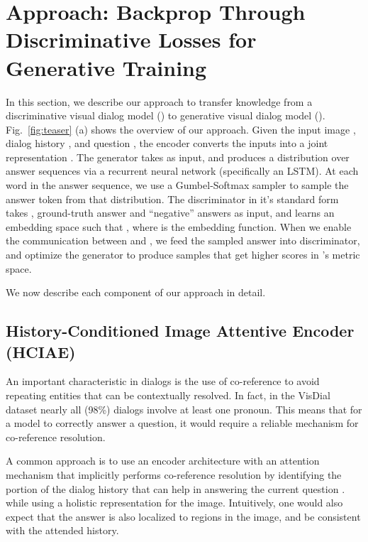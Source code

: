\documentclass{article}
\newcommand{\vd}{VisDial\xspace}
\newcommand{\ourenc}{HCIAE\xspace}
\begin{document}
\section{Approach: Backprop Through Discriminative Losses for Generative Training}
\vspace{-1mm}
In this section, we describe our approach to transfer knowledge from a discriminative visual dialog model () 
to generative visual dialog model ().  
Fig.~\ref{fig:teaser} (a) shows the overview of our approach.  
Given the input image , dialog history , and question , the encoder converts the inputs into a joint representation 
. 
The generator  takes  as input, and produces a distribution over answer sequences via a recurrent 
neural network (specifically an LSTM).  
At each word in the answer sequence, we use a Gumbel-Softmax sampler  to sample the answer token from that distribution. 
The discriminator  in it's standard form takes , ground-truth answer  and  ``negative'' answers 
 as input, and learns an embedding space such that 
, 
where  is the embedding function. 
When we enable the communication between  and , 
we feed the sampled answer  into discriminator, 
and optimize the generator  to produce samples that get higher scores in 's metric space. 

We now describe each component of our approach in detail. 

\subsection{History-Conditioned Image Attentive Encoder (\ourenc)}
\label{sec:encoder}

An important characteristic in dialogs is the use of co-reference to avoid repeating entities that can be contextually resolved. In fact, in the 
\vd dataset \cite{visdial} nearly all (98\%) dialogs involve at least one pronoun. 
This means that for a model to correctly answer a question, it would require a reliable mechanism for co-reference resolution. 

A common approach is to use an encoder architecture with an attention mechanism that implicitly performs co-reference resolution 
by identifying the portion of the dialog history that can help in answering the current question \cite{visdial, serban2015building, serban2016hierarchical, mei2016coherent}. 
while using a holistic representation for the image. Intuitively, one would also expect that the answer is also localized to regions in the image, and be consistent with the attended history. 
\end{document}
